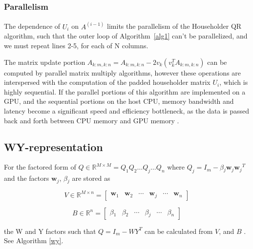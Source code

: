 \documentclass{article}
\begin{document}
\subsubsection{Parallelism}
\paragraph{}
The dependence of $U_i$ on $A^{(i-1)}$ limits the parallelism of the Householder QR algorithm, such that the outer loop of Algorithm~\ref{alg1} can't be parallelized, and we must repeat lines 2-5, for each of N columns.

The matrix update portion $A_{k:m,k:n} = A_{k:m,k:n}-2v_{k}(v_{k}^{T}A_{k:m,k:n})$ can be computed by parallel matrix multiply algorithms, however these operations are interspersed with the computation of the padded householder matrix $U_i$, which is highly sequential. If the parallel portions of this algorithm are implemented on a GPU, and the sequential portions on the host CPU, memory bandwidth and latency become a significant speed and efficiency bottleneck, as the data is passed back and forth between CPU memory and GPU memory \cite{doi:10.1137/19M1296367} \cite{BISCHOFC1987TWrf}.

\subsection{WY-representation}

For the factored form of $Q \in \mathbb{R}^{M \times M} = {Q_1}{Q_2}{\dots}{Q_j}{\dots}{Q_n}$ where $Q_j = {I_m} - {\beta{}_j}{\mathbf{w}_j}{\mathbf{w}_j}^T$ and the factors ${\mathbf{w}_j}$, ${\beta{}_j}$ are stored as  

\begin{equation}
V \in \mathbb{R}^{M \times n} =
\begin{bmatrix}
\mathbf{w}_1 & \mathbf{w}_2 & \cdots & \mathbf{w}_j & \cdots & \mathbf{w}_{n}
\end{bmatrix}
\end{equation}

\begin{equation}
B \in \mathbb{R}^{n} = 
\begin{bmatrix}
\beta{}_1 & \beta{}_2 & \cdots & \beta{}_{j} & \cdots & \beta{}_{n}
\end{bmatrix}
\end{equation}

 the W and Y factors such that $Q = I_m - {W}{Y}^T$ can be calculated from $V$, and $B$ \cite{golub} \cite{doi:10.1137/19M1296367}. See Algorithm \ref{wy}.
\end{document}
